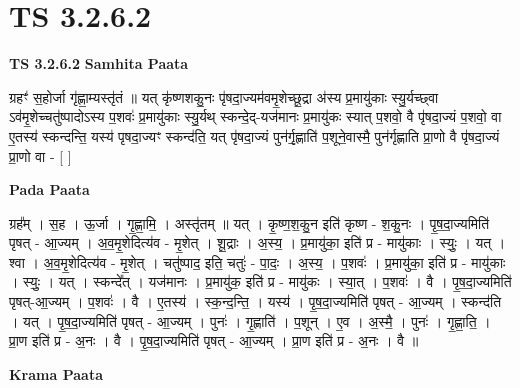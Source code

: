 \documentclass[17pt]{extarticle}
\begin{document}

\section{ TS 3.2.6.2 }

\textbf{TS 3.2.6.2 } \newline
\textbf{Samhita Paata} \newline

ग्रहꣳ॑ स॒होर्जा गृ॑ह्णा॒म्यस्तृ॑तं ॥ यत् कृ॑ष्णशकु॒नः पृ॑षदा॒ज्यम॑वमृ॒शेच्छू॒द्रा अ॑स्य प्र॒मायु॑काः स्यु॒र्यच्छ्वा ऽव॑मृ॒शेच्चतु॑ष्पादोऽस्य प॒शवः॑ प्र॒मायु॑काः स्यु॒र्यथ् स्कन्दे॒द्-यज॑मानः प्र॒मायु॑कः स्यात् प॒शवो॒ वै पृ॑षदा॒ज्यं प॒शवो॒ वा ए॒तस्य॑ स्कन्दन्ति॒ यस्य॑ पृषदा॒ज्यꣳ स्कन्द॑ति॒ यत् पृ॑षदा॒ज्यं पुन॑र्गृ॒ह्णाति॑ प॒शूने॒वास्मै॒ पुन॑र्गृह्णाति प्रा॒णो वै पृ॑षदा॒ज्यं प्रा॒णो वा - [  ] \newline

\textbf{Pada Paata} \newline

ग्रह᳚म् । स॒ह । ऊ॒र्जा । गृ॒ह्णा॒मि॒ । अस्तृ॑तम् ॥ यत् । कृ॒ष्ण॒श॒कु॒न इति॑ कृष्ण - श॒कु॒नः । पृ॒ष॒दा॒ज्यमिति॑ पृषत् - आ॒ज्यम् । अ॒व॒मृ॒शेदित्य॑व - मृ॒शेत् । शू॒द्राः । अ॒स्य॒ । प्र॒मायु॑का॒ इति॑ प्र - मायु॑काः । स्युः॒ । यत् । श्वा । अ॒व॒मृ॒शेदित्य॑व - मृ॒शेत् । चतु॑ष्पाद॒ इति॒ चतुः॑ - पा॒दः॒ । अ॒स्य॒ । प॒शवः॑ । प्र॒मायु॑का॒ इति॑ प्र - मायु॑काः । स्युः॒ । यत् । स्कन्दे᳚त् । यज॑मानः । प्र॒मायु॑क॒ इति॑ प्र - मायु॑कः । स्या॒त् । प॒शवः॑ । वै । पृ॒ष॒दा॒ज्यमिति॑ पृषत्-आ॒ज्यम् । प॒शवः॑ । वै । ए॒तस्य॑ । स्क॒न्द॒न्ति॒ । यस्य॑ । पृ॒ष॒दा॒ज्यमिति॑ पृषत् - आ॒ज्यम् । स्कन्द॑ति । यत् । पृ॒ष॒दा॒ज्यमिति॑ पृषत् - आ॒ज्यम् । पुनः॑ । गृ॒ह्णाति॑ । प॒शून् । ए॒व । अ॒स्मै॒ । पुनः॑ । गृ॒ह्णा॒ति॒ । प्रा॒ण इति॑ प्र - अ॒नः । वै । पृ॒ष॒दा॒ज्यमिति॑ पृषत् - आ॒ज्यम् । प्रा॒ण इति॑ प्र - अ॒नः । वै ॥  \newline


\textbf{Krama Paata} \newline
\end{document}
